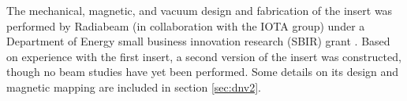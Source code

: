The mechanical, magnetic, and vacuum design and fabrication of the insert was performed by Radiabeam (in collaboration with the IOTA group) under a Department of Energy small business innovation research (SBIR) grant \cite{radiabeamInsertReports}. Based on experience with the first insert, a second version of the insert was constructed, though no beam studies have yet been performed. Some details on its design and magnetic mapping are included in section \ref{sec:dnv2}.


